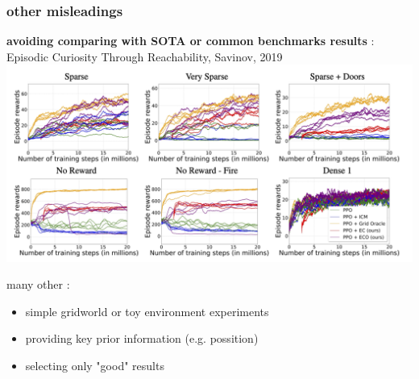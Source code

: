 \documentclass{beamer}
\begin{document}
\begin{frame}
  
  \frametitle{other misleadings}

  \centering
  {\bf avoiding comparing with SOTA or common benchmarks results} :
  Episodic Curiosity Through Reachability, Savinov, 2019 
  \includegraphics[scale=0.25]{../papers_captions/ecr.png}
  \bigskip

  many other :

  \begin{itemize}
    \item simple gridworld or toy environment experiments
    \item providing key prior information (e.g. possition)
    \item selecting only "good" results
  \end{itemize}

\end{frame}
\end{document}
